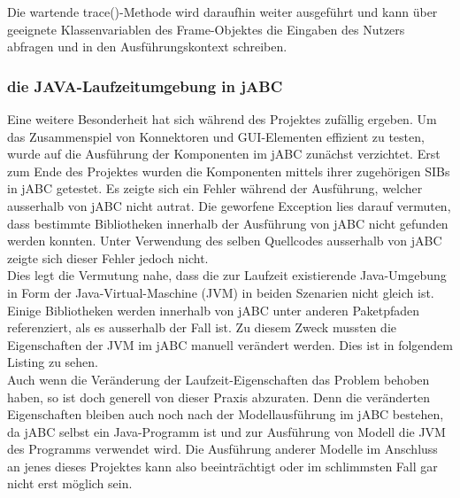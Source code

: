 Die wartende trace()-Methode wird daraufhin weiter ausgeführt und kann über geeignete Klassenvariablen des Frame-Objektes die Eingaben des Nutzers abfragen und in den Ausführungskontext schreiben.

\subsubsection{die JAVA-Laufzeitumgebung in jABC}	
Eine weitere Besonderheit hat sich während des Projektes zufällig ergeben. Um das Zusammenspiel von Konnektoren und GUI-Elementen effizient zu testen, wurde auf die Ausführung der Komponenten im jABC zunächst verzichtet. Erst zum Ende des Projektes wurden die Komponenten mittels ihrer zugehörigen SIBs in jABC getestet. Es zeigte sich ein Fehler während der Ausführung, welcher ausserhalb von jABC nicht autrat. Die geworfene Exception lies darauf vermuten, dass bestimmte Bibliotheken innerhalb der Ausführung von jABC nicht gefunden werden konnten. Unter Verwendung des selben Quellcodes ausserhalb von jABC zeigte sich dieser Fehler jedoch nicht.\\
Dies legt die Vermutung nahe, dass die zur Laufzeit existierende Java-Umgebung in Form der Java-Virtual-Maschine (JVM) in beiden Szenarien nicht gleich ist. Einige Bibliotheken werden innerhalb von jABC unter anderen Paketpfaden referenziert, als es ausserhalb der Fall ist. Zu diesem Zweck mussten die Eigenschaften der JVM im jABC manuell verändert werden. Dies ist in folgendem Listing zu sehen.\\


Auch wenn die Veränderung der Laufzeit-Eigenschaften das Problem behoben haben, so ist doch generell von dieser Praxis abzuraten. Denn die veränderten Eigenschaften bleiben auch noch nach der Modellausführung im jABC bestehen, da jABC selbst ein Java-Programm ist und zur Ausführung von Modell die JVM des Programms verwendet wird. Die Ausführung anderer Modelle im Anschluss an jenes dieses Projektes kann also beeinträchtigt oder im schlimmsten Fall gar nicht erst möglich sein.


